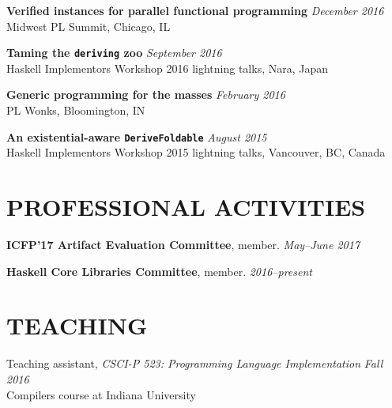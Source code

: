 \documentclass{res}
\begin{document}
\begin{resume}
    \textbf{Verified instances for parallel functional programming} \hfill \textit{December 2016} \\
    Midwest PL Summit, Chicago, IL

    \textbf{Taming the \texttt{deriving} zoo} \hfill \textit{September 2016} \\
    Haskell Implementors Workshop 2016 lightning talks, Nara, Japan

    \textbf{Generic programming for the masses} \hfill \textit{February 2016} \\
    PL Wonks, Bloomington, IN

    \textbf{An existential-aware \texttt{DeriveFoldable}} \hfill \textit{August 2015} \\
    Haskell Implementors Workshop 2015 lightning talks, Vancouver, BC, Canada

\section{PROFESSIONAL ACTIVITIES}
    \textbf{ICFP'17 Artifact Evaluation Committee}, member. \hfill \textit{May--June 2017}

    \textbf{Haskell Core Libraries Committee}, member. \hfill \textit{2016--present}

\section{TEACHING}
    Teaching assistant, \textit{CSCI-P 523: Programming Language Implementation} \hfill \textit{Fall 2016} \\
    Compilers course at Indiana University

\end{resume}
\end{document}
